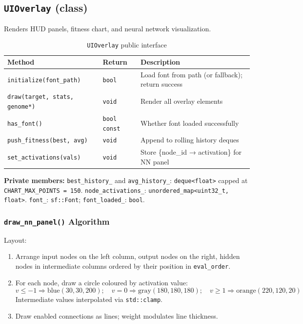 \subsection{\texttt{UIOverlay} (class)}

Renders HUD panels, fitness chart, and neural network visualization.

\begin{table}[H]
\centering\small
\caption{\texttt{UIOverlay} public interface}
\begin{tabularx}{\textwidth}{@{}llX@{}}
\toprule
\textbf{Method} & \textbf{Return} & \textbf{Description} \\
\midrule
\texttt{initialize(font\_path)} & \texttt{bool} & Load font from path (or fallback); return success \\
\texttt{draw(target, stats, genome*)} & \texttt{void} & Render all overlay elements \\
\texttt{has\_font()} & \texttt{bool const} & Whether font loaded successfully \\
\texttt{push\_fitness(best, avg)} & \texttt{void} & Append to rolling history deques \\
\texttt{set\_activations(vals)} & \texttt{void} & Store \{node\_id → activation\} for NN panel \\
\bottomrule
\end{tabularx}
\end{table}

\textbf{Private members:}
\texttt{best\_history\_} and \texttt{avg\_history\_}: \texttt{deque<float>} capped at
\texttt{CHART\_MAX\_POINTS = 150}.
\texttt{node\_activations\_}: \texttt{unordered\_map<uint32\_t, float>}.
\texttt{font\_}: \texttt{sf::Font}; \texttt{font\_loaded\_}: \texttt{bool}.

\subsubsection{\texttt{draw\_nn\_panel()} Algorithm}

Layout:
\begin{enumerate}[nosep]
  \item Arrange input nodes on the left column, output nodes on the right, hidden nodes
    in intermediate columns ordered by their position in \texttt{eval\_order}.
  \item For each node, draw a circle coloured by activation value:
    \[
      v \le -1 \Rightarrow \text{blue}(30,30,200); \quad
      v = 0   \Rightarrow \text{gray}(180,180,180); \quad
      v \ge 1 \Rightarrow \text{orange}(220,120,20)
    \]
    Intermediate values interpolated via \texttt{std::clamp}.
  \item Draw enabled connections as lines; weight modulates line thickness.
\end{enumerate}

